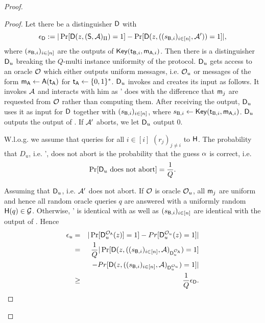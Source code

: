 \begin{proof}
\begin{proof}
Let there be a distinguisher $\mathsf D$ with
$$
\epsilon_{\mathsf D}:=|\Pr[\mathsf D(z,(\mathsf{S}, \mathcal{A})_{\Pi})=1] -\Pr[\mathsf D(z,((s_{\mathsf{B},i})_{i\in[n]},\mathcal{A}'))=1]|,
$$
where $(s_{\mathsf{B},i})_{i\in[n]}$ are the outputs of $\mathsf{Key}(\mathsf{t}_{\mathsf{B},i},\mathsf{m}_{\mathsf{A},i})$. Then there is a distinguisher $\mathsf D_u$ breaking the $Q$-multi instance uniformity of the \UKA protocol. $\mathsf D_u$ gets access to an oracle $\mathcal{O}$ which either outputs uniform messages, i.e. $\mathcal{O}_u$ or messages of  the form $\mathsf{m}_\mathsf{A}\leftarrow\mathsf{A}(\mathsf{t}_\mathsf{A})$ for $\mathsf{t}_\mathsf{A}\leftarrow\{0,1\}^*$. $\mathsf D_u$ invokes \D and creates its input as follows. It invokes $\mathcal{A}$ and interacts with him as \Adv' does with the difference that $\mathsf{m}_j$ are requested from $\mathcal{O}$ rather than computing them.  After receiving the output, $\mathsf D_u$ uses it as input for $\mathsf D$ together with $(s_{\mathsf{B},i})_{i\in[n]}$, where $s_{\mathsf{B},i}\leftarrow\mathsf{Key}(\mathsf{t}_{\mathsf{B},i},\mathsf{m}_{\mathsf{A},i})$. $\mathsf D_u$ outputs the output of \D. If $\mathcal{A}'$ aborts, we let $\mathsf D_u$ output $0$.

W.l.o.g. we assume that \Adv queries for all $i\in[i]$ $(r_j)_{j\neq i}$ to $\mathsf{H}$. The probability that $D_u$, i.e. \Adv', does not abort is the probability that the guess $\alpha$ is correct, i.e.
$$
\Pr[\mathsf D_u\text{ does not abort}]=\frac{1}{Q}.
$$

Assuming that $\mathsf D_u$, i.e. $\mathcal{A}'$ does not abort. If $\mathcal{O}$ is oracle $\mathcal{O}_{u}$, all $\mathsf{m}_j$ are uniform and hence all random oracle queries $q$ are answered with a uniformly random $\mathsf{H}(q)\in\mathcal{G}$.  Otherwise, \Adv' is identical with \send as well as $(s_{\mathsf{B},i})_{i\in[n]}$ are identical with the output of \send.  
Hence 
\begin{eqnarray*}
\epsilon_{u}&=&|\Pr[\mathsf D_u^{\mathcal{O}_{\mathsf{A}}}(z)]=1]-Pr[\mathsf D_u^{\mathcal{O}_{u}}(z)=1]|\\
&= &\frac{1}{Q}|\Pr[\mathsf D(z,((s_{\mathsf{B},i})_{i\in[n]},\mathcal{A})_{\mathsf D_u^{\mathcal{O}_{\mathsf{A}}}})=1]\\
&&-Pr[\mathsf D(z,((s_{\mathsf{B},i})_{i\in[n]},\mathcal{A})_{\mathsf D_u^{\mathcal{O}_{u}}})=1]|\\
&\geq&\frac{1}{Q}\epsilon_{\mathsf D}.
\end{eqnarray*}




\end{proof}
\end{proof}
